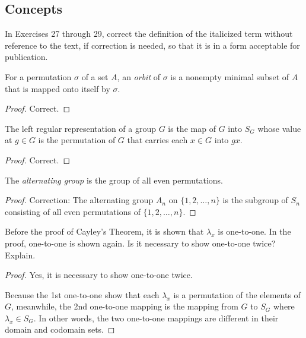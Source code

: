\subsection*{Concepts}

In Exercises 27 through 29, correct the definition of the italicized term without reference to the text, if correction is needed, so that it is in a form acceptable for publication.

\newpage
\begin{exercise}
    For a permutation $\sigma$ of a set $A$, an \textit{orbit} of $\sigma$ is a nonempty minimal subset of $A$ that is mapped onto itself by $\sigma$.
\end{exercise}

\begin{proof}
    Correct.
\end{proof}

\newpage
\begin{exercise}
    The left regular representation of a group $G$ is the map of $G$ into $S_{G}$ whose value at $g\in G$ is the permutation of $G$ that carries each $x\in G$ into $gx$.
\end{exercise}

\begin{proof}
    Correct.
\end{proof}

\newpage
\begin{exercise}
    The \textit{alternating group} is the group of all even permutations.
\end{exercise}

\begin{proof}
    Correction: The alternating group $A_{n}$ on $\{ 1, 2,\ldots, n \}$ is the subgroup of $S_{n}$ consisting of all even permutations of $\{ 1, 2,\ldots, n \}$.
\end{proof}

\newpage
\begin{exercise}
    Before the proof of Cayley's Theorem, it is shown that $\lambda_{x}$ is one-to-one. In the proof, one-to-one is shown again. Is it necessary to show one-to-one twice? Explain.
\end{exercise}

\begin{proof}
    Yes, it is necessary to show one-to-one twice.

    Because the 1st one-to-one show that each $\lambda_{x}$ is a permutation of the elements of $G$, meanwhile, the 2nd one-to-one mapping is the mapping from $G$ to $S_{G}$ where $\lambda_{x}\in S_{G}$. In other words, the two one-to-one mappings are different in their domain and codomain sets.
\end{proof}

